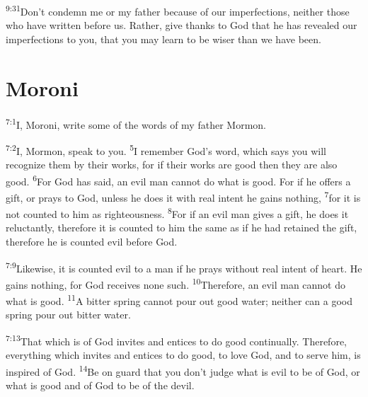 \documentclass[openany,12pt,english]{book}
\newenvironment{para}{\par\pretolerance=100\tolerance=200\setlength{\emergencystretch}{0.6em}\relax}{\par}
\begin{document}
\begin{para}
    \textsuperscript{9:31}\thinspace{}Don't con\-demn me or my fa\-ther be\-cause of our imperfections, nei\-ther those who have writ\-ten be\-fore us. Rath\-er, give thanks to God that he has revealed our imperfections to you, that you may learn to be wis\-er than we have been.
\end{para}

\section*{Moroni}
\begin{para}
    \textsuperscript{7:1}\thinspace{}I, Moroni, write some of the words of my fa\-ther Mormon.
\end{para}

\bigskip{}

\begin{para}
    \textsuperscript{7:2}\thinspace{}I, Mormon, speak to you.
    \textsuperscript{5}\thinspace{}I re\-mem\-ber God's word, which says you will rec\-og\-nize them by their works, for if their works are good then they are al\-so good.
    \textsuperscript{6}\thinspace{}For God has said, an evil man can\-not do what is good. For if he offers a gift, or prays to God, un\-less he does it with re\-al in\-tent he gains noth\-ing,
    \textsuperscript{7}\thinspace{}for it is not counted to him as right\-eous\-ness.
    \textsuperscript{8}\thinspace{}For if an evil man gives a gift, he does it re\-luc\-tant\-ly, there\-fore it is counted to him the same as if he had retained the gift, there\-fore he is counted evil be\-fore God.
\end{para}

\begin{para}
    \textsuperscript{7:9}\thinspace{}Like\-wise, it is counted evil to a man if he prays with\-out re\-al in\-tent of heart. He gains noth\-ing, for God receives none such.
    \textsuperscript{10}\thinspace{}There\-fore, an evil man can\-not do what is good.
    \textsuperscript{11}\thinspace{}A bit\-ter spring can\-not pour out good wa\-ter; nei\-ther can a good spring pour out bit\-ter wa\-ter.
\end{para}

\begin{para}
    \textsuperscript{7:13}\thinspace{}That which is of God invites and entices to do good con\-tin\-u\-al\-ly. There\-fore, eve\-ry\-thing which invites and entices to do good, to love God, and to serve him, is in\-spired of God.
    \textsuperscript{14}\thinspace{}Be on guard that you don't judge what is evil to be of God, or what is good and of God to be of the dev\-il.
\end{para}
\end{document}
